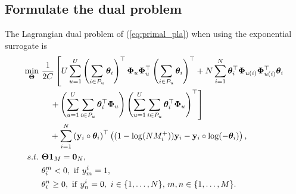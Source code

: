 \subsection{Formulate the dual problem}
The Lagrangian dual problem of (\ref{eq:primal_pla}) when using the exponential surrogate is
\begin{equation}
\label{eq:dual_pla}
\begin{aligned}
\min_{\Thetabm} \ & \frac{1}{2 C} \left[
     U \sum_{u=1}^U \left( \sum_{i \in P_u} \thetabm_i \right)^\top \Phibm_u \Phibm_u^\top \left( \sum_{i \in P_u} \thetabm_i \right)^\top
   + N \sum_{i=1}^N \thetabm_i^\top \Phibm_{u(i)} \Phibm_{u(i)}^\top \thetabm_i \right. \\
& \quad \left.
   + \left( \sum_{u=1}^U \sum_{i \in P_u} \thetabm_i^\top \Phibm_u \right)
     \left( \sum_{u=1}^U \sum_{i \in P_u} \thetabm_i^\top \Phibm_u \right)^\top \right] \\
& \quad
   + \sum_{i=1}^N \left( \y_i \circ \thetabm_i \right)^\top 
     \left( (1 - \log(N M_i^+)) \y_i - \y_i \circ \log(-\thetabm_i) \right), \\
s.t. \ 
& \Thetabm \one_M = \zero_N, \\
&\theta_i^m < 0, \ \mathrm{if} \ y_m^i = 1, \\
&\theta_i^n \ge 0, \ \mathrm{if} \ y_n^i = 0, \ i \in \{1,\dots,N\}, \, m,n \in \{1,\dots,M\}.
\end{aligned}
\end{equation}
